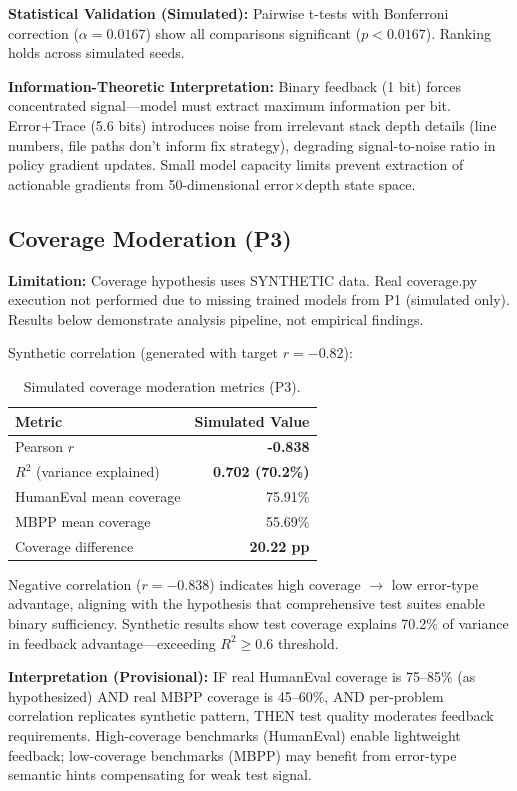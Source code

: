 \textbf{Statistical Validation (Simulated):} Pairwise t-tests with Bonferroni correction ($\alpha=0.0167$) show all comparisons significant ($p < 0.0167$). Ranking holds across simulated seeds.

\textbf{Information-Theoretic Interpretation:} Binary feedback (1 bit) forces concentrated signal---model must extract maximum information per bit. Error+Trace (5.6 bits) introduces noise from irrelevant stack depth details (line numbers, file paths don't inform fix strategy), degrading signal-to-noise ratio in policy gradient updates. Small model capacity limits prevent extraction of actionable gradients from 50-dimensional error$\times$depth state space.

\subsection{Coverage Moderation (P3)}

\textbf{Limitation:} Coverage hypothesis uses SYNTHETIC data. Real coverage.py execution not performed due to missing trained models from P1 (simulated only). Results below demonstrate analysis pipeline, not empirical findings.

Synthetic correlation (generated with target $r=-0.82$):

\begin{table}[h]
\centering
\caption{Simulated coverage moderation metrics (P3).}
\label{tab:p3_results}
\begin{tabular}{lr}
\toprule
Metric & Simulated Value \\
\midrule
Pearson $r$ & \textbf{-0.838} \\
$R^2$ (variance explained) & \textbf{0.702 (70.2\%)} \\
HumanEval mean coverage & 75.91\% \\
MBPP mean coverage & 55.69\% \\
Coverage difference & \textbf{20.22 pp} \\
\bottomrule
\end{tabular}
\end{table}

Negative correlation ($r=-0.838$) indicates high coverage $\rightarrow$ low error-type advantage, aligning with the hypothesis that comprehensive test suites enable binary sufficiency. Synthetic results show test coverage explains 70.2\% of variance in feedback advantage---exceeding $R^2 \geq 0.6$ threshold.

\textbf{Interpretation (Provisional):} IF real HumanEval coverage is 75--85\% (as hypothesized) AND real MBPP coverage is 45--60\%, AND per-problem correlation replicates synthetic pattern, THEN test quality moderates feedback requirements. High-coverage benchmarks (HumanEval) enable lightweight feedback; low-coverage benchmarks (MBPP) may benefit from error-type semantic hints compensating for weak test signal.

